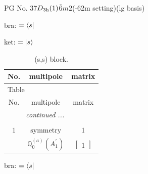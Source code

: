 \documentclass[fleqn,8pt,landscape]{jsarticle}
\begin{document}
\setcounter{MaxMatrixCols}{32}

\renewcommand{\tablename}{Table~}
\renewcommand{\figurename}{Figure~}
\begin{center}
\LARGE
PG No. 37\quad$D_{\rm 3h}(1)$\quad$\bar{6}m2$\quad(-62m setting)\quad[ hexagonal ] (lg basis)
\end{center}
bra: $=\bra{s}$

\noindent
ket: $=\ket{s}$
\renewcommand{\arraystretch}{1.6}
\begin{longtable}{ccc}
\caption{(s,s) block.}
 \\
 \hline \hline
No. & multipole & matrix \\ \hline \endfirsthead

\multicolumn{2}{l}{\tablename\ \thetable{}} \\
 \hline \hline
No. & multipole & matrix \\ \hline \endhead

 \hline \hline
\multicolumn{2}{r}{\footnotesize\it continued ...} \\ \endfoot

 \hline \hline
\multicolumn{2}{r}{} \\ \endlastfoot

$ 1 $ & $ \text{symmetry} $ & $ 1 $ \\
$  $ & $ \mathbb{Q}_{0}^{(a)}(A_{1}^{\prime}) $ & $ \begin{bmatrix} 1 \end{bmatrix} $ \\ \hline
\end{longtable}
bra: $=\bra{s}$
\end{document}
